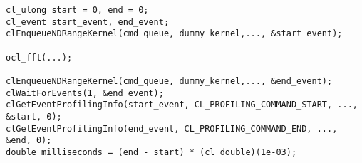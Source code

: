 \lstset{language=C++}
\begin{lstlisting}
cl_ulong start = 0, end = 0;
cl_event start_event, end_event;
clEnqueueNDRangeKernel(cmd_queue, dummy_kernel,..., &start_event);

ocl_fft(...);

clEnqueueNDRangeKernel(cmd_queue, dummy_kernel,..., &end_event);
clWaitForEvents(1, &end_event);
clGetEventProfilingInfo(start_event, CL_PROFILING_COMMAND_START, ..., &start, 0);
clGetEventProfilingInfo(end_event, CL_PROFILING_COMMAND_END, ..., &end, 0);
double milliseconds = (end - start) * (cl_double)(1e-03);
\end{lstlisting}